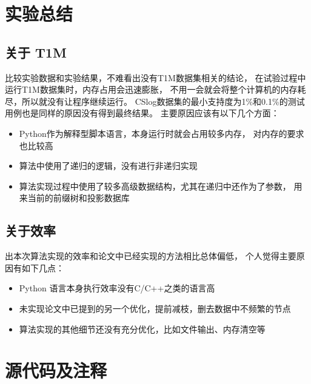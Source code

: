 \documentclass{ctexart}
\let\stdsection\section
\renewcommand\section{\newpage\stdsection}
\begin{document}
\section{实验总结}

\subsection{关于 T1M}

比较实验数据和实验结果，不难看出没有T1M数据集相关的结论，
在试验过程中运行T1M数据集时，内存占用会迅速膨胀，
不用一会就会将整个计算机的内存耗尽，所以就没有让程序继续运行。
CSlog数据集的最小支持度为1\%和0.1\%的测试用例也是同样的原因没有得到最终结果。
主要原因应该有以下几个方面：
\begin{itemize}
    \item Python作为解释型脚本语言，本身运行时就会占用较多内存，
        对内存的要求也比较高
    \item 算法中使用了递归的逻辑，没有进行非递归实现
    \item 算法实现过程中使用了较多高级数据结构，尤其在递归中还作为了参数，
        用来当前的前缀树和投影数据库
\end{itemize}

\subsection{关于效率}

出本次算法实现的效率和论文中已经实现的方法相比总体偏低，
个人觉得主要原因有如下几点：
\begin{itemize}
    \item Python 语言本身执行效率没有C/C++之类的语言高
    \item 未实现论文中已提到的另一个优化，提前减枝，删去数据中不频繁的节点
    \item 算法实现的其他细节还没有充分优化，比如文件输出、内存清空等
\end{itemize}

\section{源代码及注释}









\end{document}
